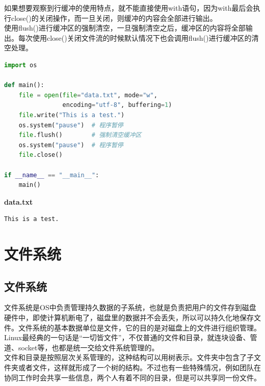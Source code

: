 如果想要观察到行缓冲的使用特点，就不能直接使用with语句，因为with最后会执行close()的关闭操作，而一旦关闭，则缓冲的内容会全部进行输出。 \\

使用flush()进行缓冲区的强制清空，一旦强制清空之后，缓冲区的内容将全部输出。每次使用close()关闭文件流的时候默认情况下也会调用flush()进行缓冲区的清空处理。 \\


\begin{lstlisting}[language=Python]
import os

def main():
    file = open(file="data.txt", mode="w",
                encoding="utf-8", buffering=1)
    file.write("This is a test.")
    os.system("pause")  # 程序暂停
    file.flush()        # 强制清空缓冲区
    os.system("pause")  # 程序暂停
    file.close()

if __name__ == "__main__":
    main()
\end{lstlisting}

\begin{tcolorbox}
	\textbf{data.txt}
	\begin{verbatim}
This is a test.
	\end{verbatim}
\end{tcolorbox}

\newpage

\section{文件系统}

\subsection{文件系统}

文件系统是OS中负责管理持久数据的子系统，也就是负责把用户的文件存到磁盘硬件中，即使计算机断电了，磁盘里的数据并不会丢失，所以可以持久化地保存文件。文件系统的基本数据单位是文件，它的目的是对磁盘上的文件进行组织管理。 \\

Linux最经典的一句话是``一切皆文件”，不仅普通的文件和目录，就连块设备、管道、socket等，也都是统一交给文件系统管理的。 \\

文件和目录是按照层次关系管理的，这种结构可以用树表示。文件夹中包含了子文件夹或者文件，这样就形成了一个树的结构。不过也有一些特殊情况，例如团队在协同工作时会共享一些信息，两个人有着不同的目录，但是可以共享同一份文件。 \\

